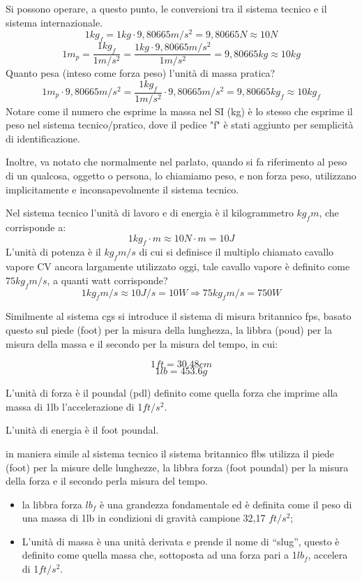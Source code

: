 \documentclass[a4paper, 15pt]{article}
\begin{document}
\begin{adjustwidth}{2in}{}
	Si possono operare, a questo punto, le conversioni tra il sistema tecnico e il sistema internazionale. 
	\[ 1kg_f = 1kg \cdot 9,80665 m/s^2 = 9,80665N \approx 10N \]
	\[ 1m_p = \dfrac{1kg_f}{1m/s^2} = \dfrac{1kg \cdot 9,80665 m/s^2}{1m/s^2} = 9,80665kg \approx 10kg \]
	Quanto pesa (inteso come forza peso) l'unità di massa pratica?
	\[1m_p \cdot 9,80665 m/s^2 = \dfrac{1kg_f}{1m/s^2} \cdot 9,80665 m/s^2 = 9,80665kg_f \approx 10kg_f \]
	Notare come il numero che esprime la massa nel SI (kg) è lo stesso che esprime il peso nel sistema tecnico/pratico, dove il pedice "f" è stati aggiunto per semplicità di identificazione. 
	
	Inoltre, va notato che normalmente nel parlato, quando si fa riferimento al peso di un qualcosa, oggetto o persona, lo chiamiamo peso, e non forza peso, utilizzano implicitamente e inconsapevolmente il sistema tecnico. 
	
	Nel sistema tecnico l'unità di lavoro e di energia è il kilogrammetro $kg_fm$, che corrisponde a:
	\[ 1kg_f\cdot m \approx 10N\cdot m = 10J\]
	L'unità di potenza è il $kg_fm/s$ di cui si definisce il multiplo chiamato cavallo vapore CV ancora largamente utilizzato oggi, tale cavallo vapore è definito come $75kg_fm/s$, a quanti watt corrisponde?
	\[ 1kg_fm/s \approx 10J/s = 10W \Rightarrow 75kg_fm/s = 750W  \]
	
	Similmente al sistema cgs si introduce il sistema di misura britannico fps, basato questo sul piede (foot) per la misura della lunghezza, la libbra (poud) per la misura della massa e il secondo per la misura del tempo, in cui:
	
	\[ 1ft = 30.48cm\]
	\[ 1lb = 453.6g\]
	
	L'unità di forza è il poundal (pdl) definito come quella forza che imprime alla massa di 1lb l'accelerazione di 1$ft/s^2$. 
	
	L'unità di energia è il foot poundal. \newline
	
	in maniera simile al sistema tecnico il sistema britannico flbs utilizza il piede (foot) per la misure delle lunghezze, la libbra forza (foot poundal) per la misura della forza e il secondo perla misura del tempo. 
	\begin{itemize}
		\item la libbra forza $lb_f$ è una grandezza fondamentale ed è definita come il peso di
		una massa di 1lb in condizioni di gravità campione 32,17 $ft/s^2$;
		\item L’unità di massa è una unità derivata e prende il nome di “slug”, questo è definito come quella massa che, sottoposta ad una forza pari a 1$lb_f$,
		accelera di 1$ft/s^2$.
		

\end{itemize}
\end{adjustwidth}
\end{document}
